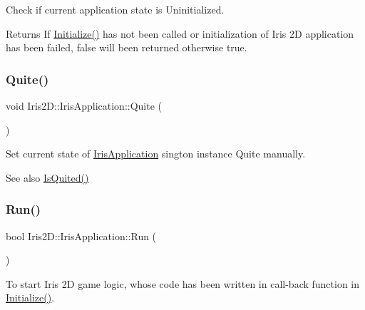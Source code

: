 Check if current application state is Uninitialized. 

\begin{DoxyReturn}{Returns}
If \hyperlink{class_iris2_d_1_1_iris_application_a84f3ddebb3a3ffb0c172bd41fb952e1a}{Initialize()} has not been called or initialization of Iris 2D application has been failed, false will been returned otherwise true. 
\end{DoxyReturn}
\mbox{\label{class_iris2_d_1_1_iris_application_adca8cada1a8841c3f409e856f6878331}} 
\subsubsection{\texorpdfstring{Quite()}{Quite()}}
{\footnotesize\ttfamily void Iris2\+D\+::\+Iris\+Application\+::\+Quite (\begin{DoxyParamCaption}{ }\end{DoxyParamCaption})}



Set current state of \hyperlink{class_iris2_d_1_1_iris_application}{Iris\+Application} sington instance Quite manually. 

\begin{DoxySeeAlso}{See also}
\hyperlink{class_iris2_d_1_1_iris_application_ae9760ff496a4c80f96ad49331407c2e4}{Is\+Quited()} 
\end{DoxySeeAlso}
\mbox{\label{class_iris2_d_1_1_iris_application_ae6bb59365978c945201fd8cf82105e4f}} 
\subsubsection{\texorpdfstring{Run()}{Run()}}
{\footnotesize\ttfamily bool Iris2\+D\+::\+Iris\+Application\+::\+Run (\begin{DoxyParamCaption}{ }\end{DoxyParamCaption})}



To start Iris 2D game logic, whose code has been written in call-\/back function in \hyperlink{class_iris2_d_1_1_iris_application_a84f3ddebb3a3ffb0c172bd41fb952e1a}{Initialize()}. 

